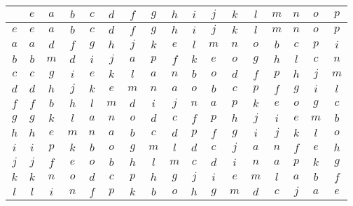 \documentclass[12pt]{amsart}
\begin{document}
\begin{center}\begin{tabular}{c|cccccccccccccccc}
	&\(e\) &\(a\) &\(b\) &\(c\) &\(d\) &\(f\) &\(g\) &\(h\) &\(i\) &\(j\) &\(k\) &\(l\) &\(m\) &\(n\) &\(o\) &\(p\) \\\hline
	\(e\)  & \(e\)  & \(a\)  & \(b\)  & \(c\)  & \(d\)  & \(f\)  & \(g\)  & \(h\)  & \(i\)  & \(j\)  & \(k\)  & \(l\)  & \(m\)  & \(n\)  & \(o\)  & \(p\)  \\
	\(a\)  & \(a\)  & \(d\)  & \(f\)  & \(g\)  & \(h\)  & \(j\)  & \(k\)  & \(e\)  & \(l\)  & \(m\)  & \(n\)  & \(o\)  & \(b\)  & \(c\)  & \(p\)  & \(i\)  \\
	\(b\)  & \(b\)  & \(m\)  & \(d\)  & \(i\)  & \(j\)  & \(a\)  & \(p\)  & \(f\)  & \(k\)  & \(e\)  & \(o\)  & \(g\)  & \(h\)  & \(l\)  & \(c\)  & \(n\)  \\
	\(c\)  & \(c\)  & \(g\)  & \(i\)  & \(e\)  & \(k\)  & \(l\)  & \(a\)  & \(n\)  & \(b\)  & \(o\)  & \(d\)  & \(f\)  & \(p\)  & \(h\)  & \(j\)  & \(m\)  \\
	\(d\)  & \(d\)  & \(h\)  & \(j\)  & \(k\)  & \(e\)  & \(m\)  & \(n\)  & \(a\)  & \(o\)  & \(b\)  & \(c\)  & \(p\)  & \(f\)  & \(g\)  & \(i\)  & \(l\)  \\
	\(f\)  & \(f\)  & \(b\)  & \(h\)  & \(l\)  & \(m\)  & \(d\)  & \(i\)  & \(j\)  & \(n\)  & \(a\)  & \(p\)  & \(k\)  & \(e\)  & \(o\)  & \(g\)  & \(c\)  \\
	\(g\)  & \(g\)  & \(k\)  & \(l\)  & \(a\)  & \(n\)  & \(o\)  & \(d\)  & \(c\)  & \(f\)  & \(p\)  & \(h\)  & \(j\)  & \(i\)  & \(e\)  & \(m\)  & \(b\)  \\
	\(h\)  & \(h\)  & \(e\)  & \(m\)  & \(n\)  & \(a\)  & \(b\)  & \(c\)  & \(d\)  & \(p\)  & \(f\)  & \(g\)  & \(i\)  & \(j\)  & \(k\)  & \(l\)  & \(o\)  \\
	\(i\)  & \(i\)  & \(p\)  & \(k\)  & \(b\)  & \(o\)  & \(g\)  & \(m\)  & \(l\)  & \(d\)  & \(c\)  & \(j\)  & \(a\)  & \(n\)  & \(f\)  & \(e\)  & \(h\)  \\
	\(j\)  & \(j\)  & \(f\)  & \(e\)  & \(o\)  & \(b\)  & \(h\)  & \(l\)  & \(m\)  & \(c\)  & \(d\)  & \(i\)  & \(n\)  & \(a\)  & \(p\)  & \(k\)  & \(g\)  \\
	\(k\)  & \(k\)  & \(n\)  & \(o\)  & \(d\)  & \(c\)  & \(p\)  & \(h\)  & \(g\)  & \(j\)  & \(i\)  & \(e\)  & \(m\)  & \(l\)  & \(a\)  & \(b\)  & \(f\)  \\
	\(l\)  & \(l\)  & \(i\)  & \(n\)  & \(f\)  & \(p\)  & \(k\)  & \(b\)  & \(o\)  & \(h\)  & \(g\)  & \(m\)  & \(d\)  & \(c\)  & \(j\)  & \(a\)  & \(e\)  \\

\end{tabular}
\end{center}
\end{document}
